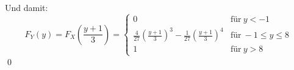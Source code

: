 \documentclass{abgabe}
\begin{document}
\begin{questions}
\begin{parts}
\begin{solution}
            Und damit: 
            \[ 
                F_Y(y) = F_X\left( \frac{y+1}{3} \right) = 
                \begin{cases}
                    0                                                                                    & \text{für} \ y < -1           \\    
                    \frac{4}{27} \left(\frac{y+1}{3}\right)^3 - \frac{1}{27}\left(\frac{y+1}{3}\right)^4 & \text{für} \ -1 \leq y \leq 8 \\    
                    1                                                                                    & \text{für} \ y > 8     
                \end{cases}
            \]
            \qed 
        \end{solution}
        
    \end{parts}
\end{questions}
\end{document}
